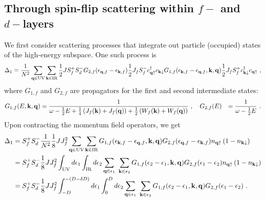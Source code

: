 \documentclass[%
reprint,
superscriptaddress,
groupedaddress,
superscriptaddress,
onecolumn,
10pt
]{revtex4-2}
\begin{document}
\subsection{Through spin-flip scattering within \(f-\) and \(d-\)layers}
We first consider scattering processes that integrate out particle (occupied) states of the high-energy subspace. One such process is
\begin{equation}\begin{aligned}
	\Delta_{1} = \frac{1}{N^2}\sum_{{\bf q} \in \text{UV}}\sum_{{\bf k} \in \text{IR}}\frac{1}{2}J S_f^+ S_d^- G_{2,f}(\epsilon_{{\bf q},f} - \epsilon_{{\bf k},f}) \frac{1}{2}J_f S_f^- c^\dagger_{{\bf q}\uparrow}c_{{\bf k}\downarrow} G_{1,f}(\epsilon_{{\bf k},f} - \epsilon_{{\bf q},f}, {\bf k}, {\bf q}) \frac{1}{2}J_fS_f^+ c^\dagger_{{\bf k}\downarrow}c_{{\bf q}\uparrow}~,
\end{aligned}\end{equation}
where \(G_{1,f}\) and \(G_{2,f}\) are propagators for the first and second intermediate states:
\begin{equation}\begin{aligned}
	G_{1,f}(E, {\bf k}, {\bf q}) &= \frac{1}{\omega - \frac{1}{2}E + \frac{1}{4}\left(J_f({\bf k}) + J_f({\bf q})\right) + \frac{1}{2}\left(W_f({\bf k}) + W_f({\bf q})\right)}~,\quad G_{2,f}(E) &= \frac{1}{\omega - \frac{1}{2}E}~.
\end{aligned}\end{equation}
Upon contracting the momentum field operators, we get
\begin{equation}\begin{aligned}
	\Delta_{1} &= S_f^+ S_d^- \frac{1}{N^2}\frac{1}{8}J J_f^2 \sum_{{\bf q} \in \text{UV}}\sum_{{\bf k} \in \text{IR}}G_{1,f}(\epsilon_{{\bf k},f} - \epsilon_{{\bf q},f}, {\bf k}, {\bf q}) G_{2,f}(\epsilon_{{\bf q},f} - \epsilon_{{\bf k},f}) n_{{\bf q}\uparrow}\left(1 - n_{{\bf k}\downarrow}\right)\\
			   &= S_f^+ S_d^- \frac{1}{8}J J_f^2 \int_\text{UV} d\epsilon_1 \int_\text{IR} d\epsilon_2 \sum_{{\bf q} \in \epsilon_1}~\sum_{{\bf k} \in \epsilon_2}G_{1,f}(\epsilon_2 - \epsilon_1, {\bf k}, {\bf q}) G_{2,f}(\epsilon_1 - \epsilon_2) n_{{\bf q}\uparrow}\left(1 - n_{{\bf k}\downarrow}\right) \\ 
			   &= S_f^+ S_d^- \frac{1}{8}J J_f^2 \int_{-D}^{-(D - \delta D)} d\epsilon_1 \int_0^D d\epsilon_2 \sum_{{\bf q} \in \epsilon_1}~\sum_{{\bf k} \in \epsilon_2}G_{1,f}(\epsilon_2 - \epsilon_1, {\bf k}, {\bf q}) G_{2,f}(\epsilon_1 - \epsilon_2)~.
\end{aligned}\end{equation}
\end{document}
